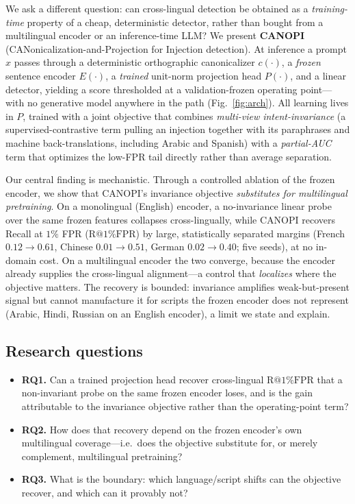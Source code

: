 \documentclass[pdflatex,sn-mathphys-num]{sn-jnl}
\makeatletter
\newcommand{\Rfpr}{\textrm{R@1\%FPR}}
\newcommand{\canon}{c}
\theoremstyle{plain}
\makeatother
\begin{document}
We ask a different question: can cross-lingual detection be obtained as a
\emph{training-time} property of a cheap, deterministic detector, rather than bought
from a multilingual encoder or an inference-time LLM? We present \textbf{CANOPI}
(CANonicalization-and-Projection for Injection detection). At inference a prompt
$x$ passes through a deterministic orthographic canonicalizer $\canon(\cdot)$, a
\emph{frozen} sentence encoder $E(\cdot)$, a \emph{trained} unit-norm projection
head $P(\cdot)$, and a linear detector, yielding a score thresholded at a
validation-frozen operating point---with no generative model anywhere in the path
(Fig.~\ref{fig:arch}). All learning lives in $P$, trained with a joint objective
that combines \emph{multi-view intent-invariance} (a supervised-contrastive term
pulling an injection together with its paraphrases and machine back-translations,
including Arabic and Spanish) with a \emph{partial-AUC} term that optimizes the
low-FPR tail directly rather than average separation.

Our central finding is mechanistic. Through a controlled ablation of the frozen
encoder, we show that CANOPI's invariance objective \emph{substitutes for
multilingual pretraining}. On a monolingual (English) encoder, a no-invariance
linear probe over the same frozen features collapses cross-lingually, while CANOPI
recovers Recall at $1\%$ FPR ($\Rfpr$) by large, statistically separated margins
(French $0.12\!\to\!0.61$, Chinese $0.01\!\to\!0.51$, German $0.02\!\to\!0.40$;
five seeds), at no in-domain cost. On a multilingual encoder the two converge,
because the encoder already supplies the cross-lingual alignment---a control that
\emph{localizes} where the objective matters. The recovery is bounded: invariance
amplifies weak-but-present signal but cannot manufacture it for scripts the frozen
encoder does not represent (Arabic, Hindi, Russian on an English encoder), a limit
we state and explain.

\subsection*{Research questions}
\begin{itemize}
  \item \textbf{RQ1.} Can a trained projection head recover cross-lingual $\Rfpr$
  that a non-invariant probe on the same frozen encoder loses, and is the gain
  attributable to the invariance objective rather than the operating-point term?
  \item \textbf{RQ2.} How does that recovery depend on the frozen encoder's own
  multilingual coverage---i.e.\ does the objective substitute for, or merely
  complement, multilingual pretraining?
  \item \textbf{RQ3.} What is the boundary: which language/script shifts can the
  objective recover, and which can it provably not?
\end{itemize}
\end{document}
